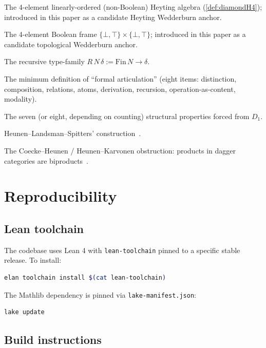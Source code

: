 \documentclass[11pt,a4paper]{article}
\theoremstyle{plain}
\theoremstyle{definition}
\theoremstyle{remark}
\newcommand{\DiamondH}{\mathrm{DiamondH4}}
\newcommand{\Sierp}{\mathrm{Sierpinski}}
\begin{document}
\begin{description}[leftmargin=*,style=nextline]
\item[$\DiamondH$] The 4-element linearly-ordered (non-Boolean) Heyting algebra (\cref{def:diamondH4}); introduced in this paper as a candidate Heyting Wedderburn anchor.
\item[$\Sierp^2$] The 4-element Boolean frame $\{\bot, \top\} \times \{\bot, \top\}$; introduced in this paper as a candidate topological Wedderburn anchor.
\item[R-family] The recursive type-family $R\,N\,\delta := \mathrm{Fin}\,N \to \delta$.
\item[$D_1$ articulation] The minimum definition of ``formal articulation'' (eight items: distinction, composition, relations, atoms, derivation, recursion, operation-as-content, modality).
\item[P1--P7] The seven (or eight, depending on counting) structural properties forced from $D_1$.
\item[Bohrification] Heunen--Landsman--Spitters' construction~\cite{HLS09}.
\item[Open Problem O1] The Coecke--Heunen / Heunen--Karvonen obstruction: products in dagger categories are biproducts~\cite{CH16,HK19}.
\end{description}

\section{Reproducibility}\label{app:repro}

\subsection{Lean toolchain}\label{app:repro:toolchain}

The codebase uses Lean 4 with \texttt{lean-toolchain} pinned to a specific stable release. To install:
\begin{lstlisting}[language=bash]
elan toolchain install $(cat lean-toolchain)
\end{lstlisting}

The Mathlib dependency is pinned via \texttt{lake-manifest.json}:
\begin{lstlisting}[language=bash]
lake update
\end{lstlisting}

\subsection{Build instructions}\label{app:repro:build}
\end{document}

